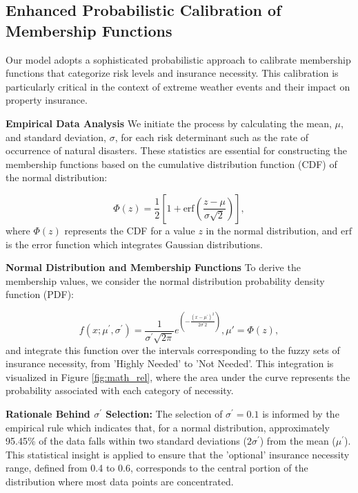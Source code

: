 \documentclass{mcmthesis}
\begin{document}
\subsection{Enhanced Probabilistic Calibration of Membership Functions}
Our model adopts a sophisticated probabilistic approach to calibrate membership functions that categorize risk levels and insurance necessity. This calibration is particularly critical in the context of extreme weather events and their impact on property insurance.

\textbf{Empirical Data Analysis}
We initiate the process by calculating the mean, $\mu$, and standard deviation, $\sigma$, for each risk determinant such as the rate of occurrence of natural disasters. These statistics are essential for constructing the membership functions based on the cumulative distribution function (CDF) of the normal distribution:

\begin{equation}
\Phi(z) = \frac{1}{2}\left[1 + \text{erf}\left(\frac{z - \mu}{\sigma\sqrt{2}}\right)\right],
\end{equation}
where $\Phi(z)$ represents the CDF for a value $z$ in the normal distribution, and $\text{erf}$ is the error function which integrates Gaussian distributions.

\textbf{Normal Distribution and Membership Functions}
To derive the membership values, we consider the normal distribution probability density function (PDF):

\begin{equation}
    f(x; \mu^\prime, \sigma^\prime) = \frac{1}{\sigma^\prime\sqrt{2\pi}}e^{(-\frac{(x - \mu^\prime)^2}{2\sigma^\prime2})}, \mu' = \Phi(z),
\end{equation}
and integrate this function over the intervals corresponding to the fuzzy sets of insurance necessity, from 'Highly Needed' to 'Not Needed'. This integration is visualized in Figure \ref{fig:math_rel}, where the area under the curve represents the probability associated with each category of necessity.

\textbf{Rationale Behind $\sigma^\prime$ Selection:}
The selection of $\sigma^\prime = 0.1$ is informed by the empirical rule which indicates that, for a normal distribution, approximately 95.45\% of the data falls within two standard deviations ($2\sigma^\prime$) from the mean ($\mu^\prime$). This statistical insight is applied to ensure that the 'optional' insurance necessity range, defined from 0.4 to 0.6, corresponds to the central portion of the distribution where most data points are concentrated.
\end{document}
